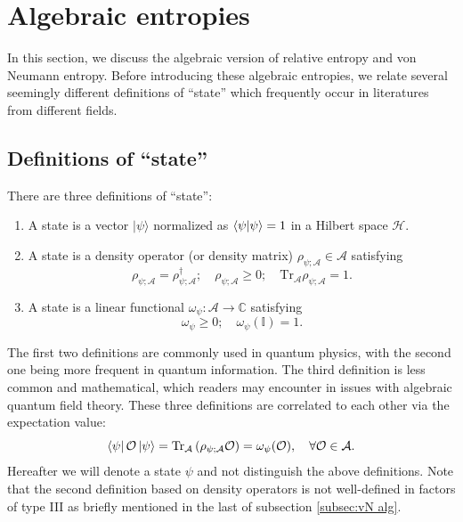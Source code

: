 \documentclass[a4paper,11pt]{article}
\newcommand{\ket}[1]{| #1 \rangle } %
\newcommand{\braket}[2]{\langle  #1 \vphantom{#2} | #2 \vphantom{#1} \rangle } %
\newcommand{\diracprod}[3]{\left\langle  #1 \vphantom{#2#3} \right|#2 \left| #3 \vphantom{#1#2} \right\rangle } %
\renewcommand{\=}[1]{\stackrel{#1}{=}} %
\def\A{\mathcal{A}}
\def\O{\mathcal{O}}
\def\H{\mathcal{H}}
\def\Tr{\text{Tr}}
\begin{document}
\section{Algebraic entropies}\label{sec:alg entropies}

In this section, we discuss the algebraic version of relative entropy and von Neumann entropy. Before introducing these algebraic entropies, we relate several seemingly different definitions of ``state'' which frequently occur in literatures from different fields.


\subsection{Definitions of ``state''}\label{sec:def of state}



There are three definitions of ``state'':
\begin{enumerate}
	\item A state is a vector $\ket{\psi}$ normalized as $\braket{\psi}{\psi}=1$ in a Hilbert space $\H$.
	
	
	
	\item A state is a density operator (or density matrix) $\rho_{\psi;\A}\in \A$ satisfying 
	\begin{equation}
		\rho_{\psi;\A}=\rho_{\psi;\A}^\dagger;\quad \rho_{\psi;\A}\geq 0;\quad\Tr_{\A}\rho_{\psi;\A}=1.
	\end{equation}
	
	
	
	\item A state is a linear functional $\omega_\psi:\A\rightarrow \mathbb{C}$ satisfying
	\begin{equation}
		\omega_\psi\geq0;\quad \omega_\psi(\mathbb{I})=1. 
	\end{equation}
\end{enumerate}

The first two definitions are commonly used in quantum physics, with the second one being more frequent in quantum information. The third definition is less common and mathematical, which readers may encounter in issues with algebraic quantum field theory. These three definitions are correlated to each other via the expectation value: 
\begin{equation}\label{eq:diff def of state}
	\diracprod{\psi}{\O}{\psi}=\Tr_{\A}\left(\rho_{\psi;\A}\O\right)=\omega_\psi(\O),\quad \forall\O\in\A.
\end{equation}
Hereafter we will denote a state $\psi$ and not distinguish the above definitions. Note that the second definition based on density operators is not well-defined in factors of type III as briefly mentioned in the last of subsection \ref{subsec:vN alg}.
\end{document}
